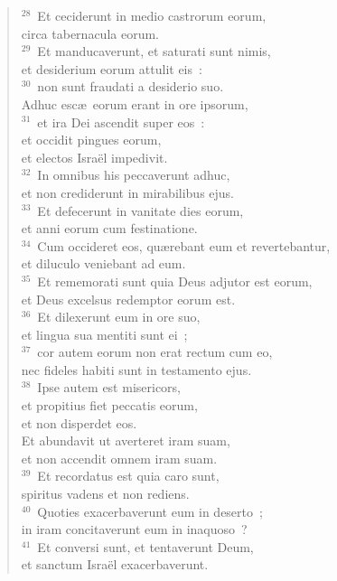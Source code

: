 \begin{flushleft}
\begin{verse}
${}^{28}$~Et ceciderunt in medio castrorum eorum,\\ circa tabernacula eorum.\\
${}^{29}$~Et manducaverunt, et saturati sunt nimis,\\ et desiderium eorum attulit eis~:\\
${}^{30}$~non sunt fraudati a desiderio suo.\\ Adhuc esc\ae\ eorum erant in ore ipsorum,\\
${}^{31}$~et ira Dei ascendit super eos~:\\ et occidit pingues eorum,\\ et electos Isra\"el impedivit.\\
${}^{32}$~In omnibus his peccaverunt adhuc,\\ et non crediderunt in mirabilibus ejus.\\
${}^{33}$~Et defecerunt in vanitate dies eorum,\\ et anni eorum cum festinatione.\\
${}^{34}$~Cum occideret eos, qu\ae rebant eum et revertebantur,\\ et diluculo veniebant ad eum.\\
${}^{35}$~Et rememorati sunt quia Deus adjutor est eorum,\\ et Deus excelsus redemptor eorum est.\\
${}^{36}$~Et dilexerunt eum in ore suo,\\ et lingua sua mentiti sunt ei~;\\
${}^{37}$~cor autem eorum non erat rectum cum eo,\\ nec fideles habiti sunt in testamento ejus.\\
${}^{38}$~Ipse autem est misericors,\\ et propitius fiet peccatis eorum,\\ et non disperdet eos.\\ Et abundavit ut averteret iram suam,\\ et non accendit omnem iram suam.\\
${}^{39}$~Et recordatus est quia caro sunt,\\ spiritus vadens et non rediens.\\
${}^{40}$~Quoties exacerbaverunt eum in deserto~;\\ in iram concitaverunt eum in inaquoso~?\\
${}^{41}$~Et conversi sunt, et tentaverunt Deum,\\ et sanctum Isra\"el exacerbaverunt.\\

\end{verse}
\end{flushleft}
